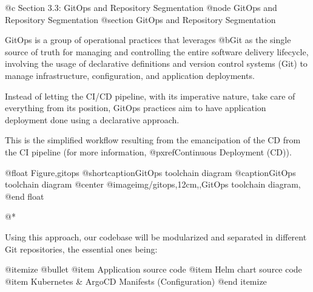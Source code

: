 @c Section 3.3: GitOps and Repository Segmentation
@node GitOps and Repository Segmentation
@section GitOps and Repository Segmentation

GitOps is a group of operational practices that leverages @b{Git as the single source of truth} for managing and controlling the entire software delivery lifecycle, involving the usage of declarative definitions and version control systems (Git) to manage infrastructure, configuration, and application deployments.

Instead of letting the CI/CD pipeline, with its imperative nature, take care of everything from its position, GitOps practices aim to have application deployment done using a declarative approach.

This is the simplified workflow resulting from the emancipation of the CD from the CI pipeline (for more information, @pxref{Continuous Deployment (CD)}).

@float Figure,gitops
@shortcaption{GitOps toolchain diagram}
@caption{GitOps toolchain diagram}
@center @image{img/gitops,12cm,,GitOps toolchain diagram,}
@end float

@*

Using this approach, our codebase will be modularized and separated in different Git repositories, the essential ones being:

@itemize @bullet
@item Application source code
@item Helm chart source code
@item Kubernetes & ArgoCD Manifests (Configuration)
@end itemize
